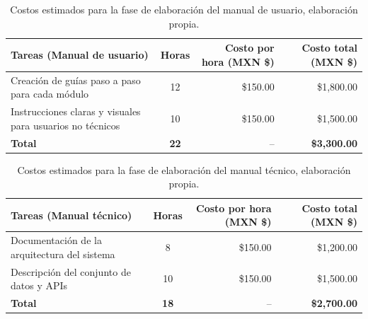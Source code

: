 \begin{table}[H]
	\centering
	\renewcommand{\arraystretch}{1.6}
	\setlength{\tabcolsep}{10pt}
	\Huge
	\begin{adjustbox}{max width=\textwidth}
		\begin{tabular}{|p{9.5cm}|c|r|r|}
			\hline
			\textbf{Tareas (Manual de usuario)} & \textbf{Horas} & \textbf{Costo por hora (MXN \$)} & \textbf{Costo total (MXN \$)} \\ \hline
			Creación de guías paso a paso para cada módulo & 12 & \$150.00 & \$1,800.00 \\ \hline
			Instrucciones claras y visuales para usuarios no técnicos & 10 & \$150.00 & \$1,500.00 \\ \hline
			\textbf{Total} & \textbf{22} & -- & \textbf{\$3,300.00} \\ \hline
		\end{tabular}
	\end{adjustbox}
	\caption[Costos estimados para la fase de elaboración del manual de usuario]{Costos estimados para la fase de elaboración del manual de usuario, elaboración propia.} 	
	\label{tab:costos_manual_nuevo}
\end{table}

\begin{table}[H]
	\centering
	\renewcommand{\arraystretch}{1.6}
	\setlength{\tabcolsep}{10pt}
	\Huge
	\begin{adjustbox}{max width=\textwidth}
		\begin{tabular}{|p{9.5cm}|c|r|r|}
			\hline
			\textbf{Tareas (Manual técnico)} & \textbf{Horas} & \textbf{Costo por hora (MXN \$)} & \textbf{Costo total (MXN \$)} \\ \hline
			Documentación de la arquitectura del sistema & 8 & \$150.00 & \$1,200.00 \\ \hline
			Descripción del conjunto de datos y APIs & 10 & \$150.00 & \$1,500.00 \\ \hline
			\textbf{Total} & \textbf{18} & -- & \textbf{\$2,700.00} \\ \hline
		\end{tabular}
	\end{adjustbox}
	\caption[Costos estimados para la fase de elaboración del manual técnico]{Costos estimados para la fase de elaboración del manual técnico, elaboración propia.} 	
	\label{tab:costos_manual_tecnico_nuevo}
\end{table}

